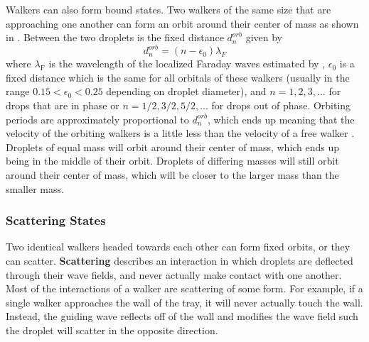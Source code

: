            Walkers can also form bound states. Two walkers of the same size that are approaching one another can form an orbit around their center of mass as shown in . Between the two droplets is the fixed distance $d_{n}^{orb}$ given by          
\begin{equation} \label{orbital}
d_{n}^{orb} = (n - \epsilon_0)\lambda_F
\end{equation}         
where $\lambda_\mathrm{F}$ is the wavelength of the localized Faraday waves estimated by , $\epsilon_0$ is a fixed distance which is the same for all orbitals of these walkers (usually in the range $0.15 < \epsilon_0 < 0.25$ depending on droplet diameter), and $n = 1,2,3,...$ for drops that are in phase or $n = 1/2, 3/2, 5/2,...$ for drops out of phase. Orbiting periods are approximately proportional to $d_{n}^{orb}$, which ends up meaning that the velocity of the orbiting walkers is a little less than the velocity of a free walker . Droplets of equal mass will orbit around their center of mass, which ends up being in the middle of their orbit. Droplets of differing masses will still orbit around their center of mass, which will be closer to the larger mass than the smaller mass.

            \subsubsection{Scattering States}
            Two identical walkers headed towards each other can form fixed orbits, or they can scatter. \textbf{Scattering} describes an interaction in which droplets are deflected through their wave fields, and never actually make contact with one another. Most of the interactions of a walker are scattering of some form. For example, if a single walker approaches the wall of the tray, it will never actually touch the wall. Instead, the guiding wave reflects off of the wall and modifies the wave field such the droplet will scatter in the opposite direction.           



